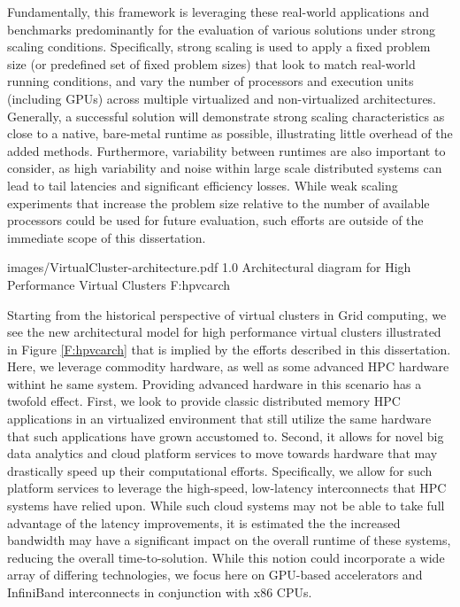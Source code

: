 Fundamentally, this framework is leveraging these real-world applications and benchmarks predominantly for the evaluation of various solutions under strong scaling conditions.  Specifically, strong scaling is used to apply a fixed problem size (or predefined set of fixed problem sizes) that look to match real-world running conditions, and vary the number of processors and execution units (including GPUs) across multiple virtualized and non-virtualized architectures.  Generally, a successful solution will demonstrate strong scaling characteristics as close to a native, bare-metal runtime as possible, illustrating little overhead of the added methods. Furthermore, variability between runtimes are also important to consider, as high variability and noise within large scale distributed systems can lead to tail latencies and significant efficiency losses.  While weak scaling experiments that increase the problem size relative to the number of available processors could be used for future evaluation, such efforts are outside of the immediate scope of this dissertation. 

  {images/VirtualCluster-architecture.pdf}
  {1.0}
  {Architectural diagram for High Performance Virtual Clusters}
  {F:hpvcarch}

Starting from the historical perspective of virtual clusters in Grid computing, we see the new architectural model for high performance virtual clusters illustrated in Figure \ref{F:hpvcarch} that is implied by the efforts described in this dissertation.  Here, we leverage commodity hardware, as well as some advanced HPC hardware withint he same system. Providing advanced hardware in this scenario has a twofold effect. First, we look to provide classic distributed memory HPC applications in an virtualized environment that still utilize the same hardware that such applications have grown accustomed to.  Second, it allows for novel big data analytics and cloud platform services to move towards hardware that may drastically speed up their computational efforts. Specifically, we allow for such platform services to leverage the high-speed, low-latency interconnects that HPC systems have relied upon. While such cloud systems may not be able to take full advantage of the latency improvements, it is estimated the the increased bandwidth may have a significant impact on the overall runtime of these systems, reducing the overall time-to-solution. While this notion could incorporate a wide array of differing technologies, we focus here on GPU-based accelerators and InfiniBand interconnects in conjunction with x86 CPUs. 

